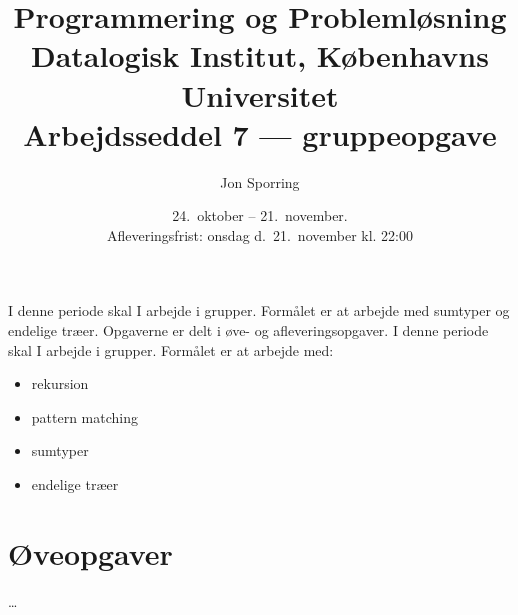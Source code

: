 \documentclass[a4paper,12pt]{article}
\title{Programmering og Problemløsning\\Datalogisk Institut,
  Københavns Universitet\\Arbejdsseddel 7 --- gruppeopgave}
\author{Jon Sporring}
\date{24.\ oktober -- 21.\ november.\\Afleveringsfrist: onsdag d.\ 21.\ november kl. 22:00}
\begin{document}
\maketitle

I denne periode skal I arbejde i grupper.  Formålet er at arbejde med
sumtyper og endelige træer. Opgaverne er delt i øve- og
afleveringsopgaver.
\noindent
I denne periode skal I arbejde i grupper. Formålet er at arbejde med:
\begin{itemize}
\item rekursion
\item pattern matching
\item sumtyper
\item endelige træer
\end{itemize}


\section*{Øveopgaver}

\dots


\end{document}
